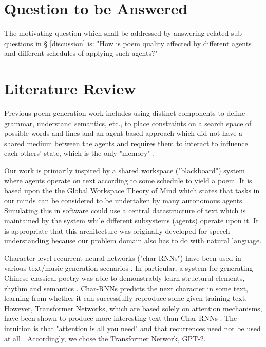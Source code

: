 \documentclass[a4paper,10pt]{article}
\begin{document}
\section{Question to be Answered}

The motivating question which shall be addressed by answering related sub-questions in § \ref{discussion} is: "How is poem quality affected by different agents and different schedules of applying such agents?"

\section{Literature Review}

Previous poem generation work includes using distinct components to define grammar, understand semantics, etc., to place constraints on a search space of possible words and lines \cite{toivanen2012corpus} \cite{toivanen2013harnessing} and an agent-based approach which did not have a shared medium between the agents and requires them to interact to influence each others' state, which is the only "memory" \cite{astigarraga_emotional_2017}.

Our work is primarily inspired by a shared workspace ("blackboard") system \cite{misztal-radecka_blackboard_2016} \cite{hayesrothblackboard1985} where agents operate on text according to some schedule to yield a poem. It is based upon the the Global Workspace Theory of Mind \cite{baars_theater_2001} \cite{Baars2003BAATGB} which states that tasks in our minds can be considered to be undertaken by many autonomous agents. Simulating this in software could use a central datastructure of text which is maintained by the system while different subsystems (agents) operate upon it. It is appropriate that this architecture was originally developed for speech understanding \cite{ERMAN1981349} \cite{carver_evolution_1994} because our problem domain also has to do with natural language.

Character-level recurrent neural networks ("char-RNNs") have been used in various text/music generation scenarios \cite{malik_music_2021}. In particular, a system for generating Chinese classical poetry was able to demonstrably learn structural elements, rhythm and semantics \cite{yi_generating_2017}. Char-RNNs predicts the next character in some text, learning from whether it can successfully reproduce some given training text. However, Transformer Networks, which are based solely on attention mechanisms, have been shown to produce more interesting text than Char-RNNs \cite{branwen_rnn_2015}. The intuition is that "attention is all you need" and that recurrences need not be used at all \cite{vaswani_attention_2017}. Accordingly, we chose the Transformer Network, GPT-2.
\end{document}
